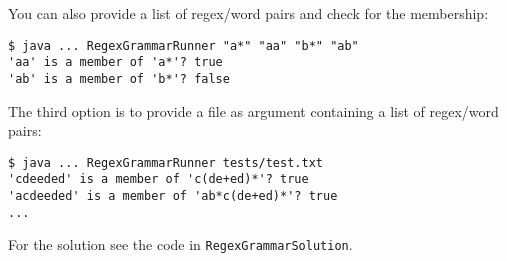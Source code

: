 \documentclass[a4paper]{article}
\begin{document}
\begin{exercise}{20}
\begin{itemize}
       You can also provide a list of regex/word pairs and check for the membership:
       \begin{lstlisting}[numbers=none,basicstyle=\ttfamily]
$ java ... RegexGrammarRunner "a*" "aa" "b*" "ab"
'aa' is a member of 'a*'? true
'ab' is a member of 'b*'? false
       \end{lstlisting}
       The third option is to provide a file as argument containing a list of regex/word pairs:
       \begin{lstlisting}[numbers=none,basicstyle=\ttfamily]
$ java ... RegexGrammarRunner tests/test.txt
'cdeeded' is a member of 'c(de+ed)*'? true
'acdeeded' is a member of 'ab*c(de+ed)*'? true
...
       \end{lstlisting}
	\end{itemize}
\end{exercise}

\begin{solution}
    For the solution see the code in \texttt{RegexGrammarSolution}.
\end{solution}
\end{document}
